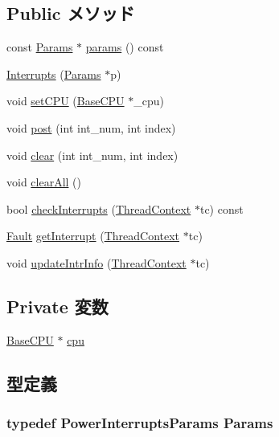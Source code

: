 \subsection*{Public メソッド}
\begin{DoxyCompactItemize}
\item 
const \hyperlink{classPowerISA_1_1Interrupts_afef99f4d4235119dc325f254c17f46b8}{Params} $\ast$ \hyperlink{classPowerISA_1_1Interrupts_acd3c3feb78ae7a8f88fe0f110a718dff}{params} () const 
\item 
\hyperlink{classPowerISA_1_1Interrupts_a3d148759405b99148e0c34750966edb1}{Interrupts} (\hyperlink{classPowerISA_1_1Interrupts_afef99f4d4235119dc325f254c17f46b8}{Params} $\ast$p)
\item 
void \hyperlink{classPowerISA_1_1Interrupts_a2ab8c6aed9969bc58d6aa2427d442cc4}{setCPU} (\hyperlink{classBaseCPU}{BaseCPU} $\ast$\_\-cpu)
\item 
void \hyperlink{classPowerISA_1_1Interrupts_a24c6c4fbdc0605bcd015ce06f194e4b4}{post} (int int\_\-num, int index)
\item 
void \hyperlink{classPowerISA_1_1Interrupts_af60c3484087379d0330467d77f6cbaae}{clear} (int int\_\-num, int index)
\item 
void \hyperlink{classPowerISA_1_1Interrupts_a798729dca95209ecdc609807a653a2bf}{clearAll} ()
\item 
bool \hyperlink{classPowerISA_1_1Interrupts_af3c66fb49fec598cf78aaec29d764952}{checkInterrupts} (\hyperlink{classThreadContext}{ThreadContext} $\ast$tc) const 
\item 
\hyperlink{classRefCountingPtr}{Fault} \hyperlink{classPowerISA_1_1Interrupts_ae603c88d759977611d3bcc6e2deb61ae}{getInterrupt} (\hyperlink{classThreadContext}{ThreadContext} $\ast$tc)
\item 
void \hyperlink{classPowerISA_1_1Interrupts_a00892e9b06edcba6c3c27454d6235100}{updateIntrInfo} (\hyperlink{classThreadContext}{ThreadContext} $\ast$tc)
\end{DoxyCompactItemize}
\subsection*{Private 変数}
\begin{DoxyCompactItemize}
\item 
\hyperlink{classBaseCPU}{BaseCPU} $\ast$ \hyperlink{classPowerISA_1_1Interrupts_a7a31ca9fefb2fe821f29a270678912db}{cpu}
\end{DoxyCompactItemize}


\subsection{型定義}
\hypertarget{classPowerISA_1_1Interrupts_afef99f4d4235119dc325f254c17f46b8}{
\subsubsection[{Params}]{\setlength{\rightskip}{0pt plus 5cm}typedef PowerInterruptsParams {\bf Params}}}
\label{classPowerISA_1_1Interrupts_afef99f4d4235119dc325f254c17f46b8}



